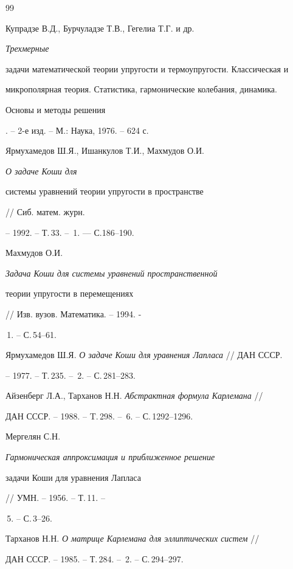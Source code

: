 \begin{thebibliography}{99} 


 




Купрадзе В.Д., Бурчуладзе Т.В., Гегелиа Т.Г. и др. {\em Трехмерные 


задачи математической теории упругости и термоупругости. Классическая и 


микрополярная теория. Статистика, гармонические колебания, динамика. 


Основы и методы решения}. -- 2-е изд. -- М.: Наука, 1976. -- 624 с. 




Ярмухамедов Ш.Я., Ишанкулов Т.И., Махмудов О.И. {\em О задаче Коши для 


системы уравнений теории упругости в пространстве} // Сиб. матем. журн. 


-- 1992. -- Т.\,33. -- \No\,1. --- С.186--190. 




Махмудов О.И. {\em Задача Коши для системы уравнений пространственной 


теории упругости в перемещениях} // Изв. вузов. Математика. -- 1994. - 


\No\,1. -- С.\,54--61. 




Ярмухамедов Ш.Я. {\em О задаче Коши для уравнения Лапласа} // ДАН СССР. 


-- 1977. -- Т.\,235. -- \No\,2. -- С.\,281--283. 




Айзенберг Л.А., Тарханов Н.Н. {\em Абстрактная формула Карлемана} // 


ДАН СССР. -- 1988. -- T.\,298. -- \No\,6. -- С.\,1292--1296. 




Мергелян С.Н. {\em Гармоническая аппроксимация и приближенное решение 


задачи Коши для уравнения Лапласа} // УМН. -- 1956. -- Т.\,11. -- 


\No\,5. -- С.\,3--26. 




Тарханов Н.Н. {\em О матрице Карлемана для эллиптических систем} // 


ДАН СССР. -- 1985. -- Т.\,284. -- \No\,2. -- С.\,294--297. 





\end{thebibliography}
